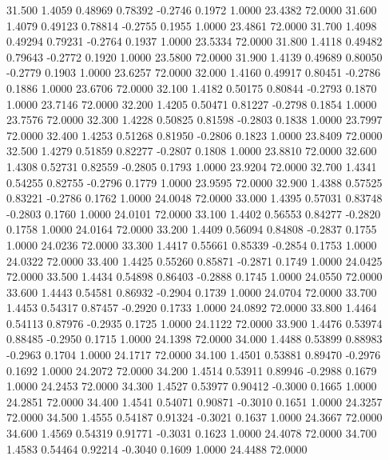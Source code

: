   31.500   1.4059   0.48969   0.78392  -0.2746   0.1972   1.0000  23.4382  72.0000
  31.600   1.4079   0.49123   0.78814  -0.2755   0.1955   1.0000  23.4861  72.0000
  31.700   1.4098   0.49294   0.79231  -0.2764   0.1937   1.0000  23.5334  72.0000
  31.800   1.4118   0.49482   0.79643  -0.2772   0.1920   1.0000  23.5800  72.0000
  31.900   1.4139   0.49689   0.80050  -0.2779   0.1903   1.0000  23.6257  72.0000
  32.000   1.4160   0.49917   0.80451  -0.2786   0.1886   1.0000  23.6706  72.0000
  32.100   1.4182   0.50175   0.80844  -0.2793   0.1870   1.0000  23.7146  72.0000
  32.200   1.4205   0.50471   0.81227  -0.2798   0.1854   1.0000  23.7576  72.0000
  32.300   1.4228   0.50825   0.81598  -0.2803   0.1838   1.0000  23.7997  72.0000
  32.400   1.4253   0.51268   0.81950  -0.2806   0.1823   1.0000  23.8409  72.0000
  32.500   1.4279   0.51859   0.82277  -0.2807   0.1808   1.0000  23.8810  72.0000
  32.600   1.4308   0.52731   0.82559  -0.2805   0.1793   1.0000  23.9204  72.0000
  32.700   1.4341   0.54255   0.82755  -0.2796   0.1779   1.0000  23.9595  72.0000
  32.900   1.4388   0.57525   0.83221  -0.2786   0.1762   1.0000  24.0048  72.0000
  33.000   1.4395   0.57031   0.83748  -0.2803   0.1760   1.0000  24.0101  72.0000
  33.100   1.4402   0.56553   0.84277  -0.2820   0.1758   1.0000  24.0164  72.0000
  33.200   1.4409   0.56094   0.84808  -0.2837   0.1755   1.0000  24.0236  72.0000
  33.300   1.4417   0.55661   0.85339  -0.2854   0.1753   1.0000  24.0322  72.0000
  33.400   1.4425   0.55260   0.85871  -0.2871   0.1749   1.0000  24.0425  72.0000
  33.500   1.4434   0.54898   0.86403  -0.2888   0.1745   1.0000  24.0550  72.0000
  33.600   1.4443   0.54581   0.86932  -0.2904   0.1739   1.0000  24.0704  72.0000
  33.700   1.4453   0.54317   0.87457  -0.2920   0.1733   1.0000  24.0892  72.0000
  33.800   1.4464   0.54113   0.87976  -0.2935   0.1725   1.0000  24.1122  72.0000
  33.900   1.4476   0.53974   0.88485  -0.2950   0.1715   1.0000  24.1398  72.0000
  34.000   1.4488   0.53899   0.88983  -0.2963   0.1704   1.0000  24.1717  72.0000
  34.100   1.4501   0.53881   0.89470  -0.2976   0.1692   1.0000  24.2072  72.0000
  34.200   1.4514   0.53911   0.89946  -0.2988   0.1679   1.0000  24.2453  72.0000
  34.300   1.4527   0.53977   0.90412  -0.3000   0.1665   1.0000  24.2851  72.0000
  34.400   1.4541   0.54071   0.90871  -0.3010   0.1651   1.0000  24.3257  72.0000
  34.500   1.4555   0.54187   0.91324  -0.3021   0.1637   1.0000  24.3667  72.0000
  34.600   1.4569   0.54319   0.91771  -0.3031   0.1623   1.0000  24.4078  72.0000
  34.700   1.4583   0.54464   0.92214  -0.3040   0.1609   1.0000  24.4488  72.0000
